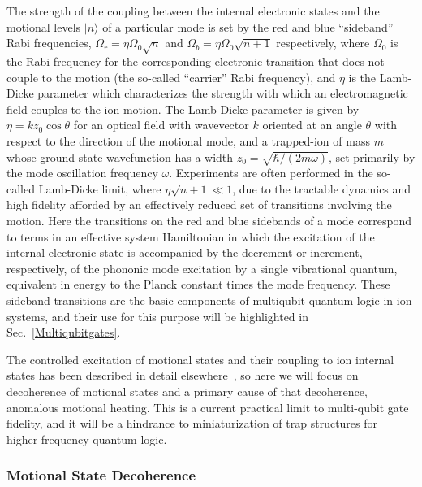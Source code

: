 \documentclass[%
reprint,
 amsmath,amssymb,
]{revtex4-1}
\begin{document}
The strength of the coupling between the internal electronic states and the motional levels $|n\rangle$ of a particular mode is set by the red and blue ``sideband'' Rabi frequencies, $\Omega_{r}=\eta \Omega_{0} \sqrt{n}$ and  $\Omega_{b}=\eta \Omega_{0} \sqrt{n+1}$ respectively, where $\Omega_{0}$ is the Rabi frequency for the corresponding electronic transition that does not couple to the motion (the so-called ``carrier'' Rabi frequency), and $\eta$ is the Lamb-Dicke parameter which characterizes the strength with which an electromagnetic field couples to the ion motion.  The Lamb-Dicke parameter is given by $\eta=k z_{0}\cos\theta$ for an optical field with wavevector $k$ oriented at an angle $\theta$ with respect to the direction of the motional mode, and a trapped-ion of mass $m$ whose ground-state wavefunction has a width $z_{0}=\sqrt{\hbar/(2 m \omega)}$, set primarily by the mode oscillation frequency $\omega$.  Experiments are often performed in the so-called Lamb-Dicke limit, where $\eta\sqrt{n+1}\ll 1$, due to the tractable dynamics and high fidelity afforded by an effectively reduced set of transitions involving the motion.  Here the transitions on the red and blue sidebands of a mode correspond to terms in an effective system Hamiltonian in which the excitation of the internal electronic state is accompanied by the decrement or increment, respectively, of the phononic mode excitation by a single vibrational quantum, equivalent in energy to the Planck constant times the mode frequency.  These sideband transitions are the basic components of multiqubit quantum logic in ion systems, and their use for this purpose will be highlighted in Sec.~\ref{Multiqubitgates}.

The controlled excitation of motional states and their coupling to ion internal states has been described in detail elsewhere~\cite{Wineland1998,leibfried2003quantum,ozeri_tutorial_2011}, so here we will focus on decoherence of motional states and a primary cause of that decoherence, anomalous motional heating.  This is a current practical limit to multi-qubit gate fidelity, and it will be a hindrance to miniaturization of trap structures for higher-frequency quantum logic.

\subsubsection{Motional State Decoherence}
\end{document}
